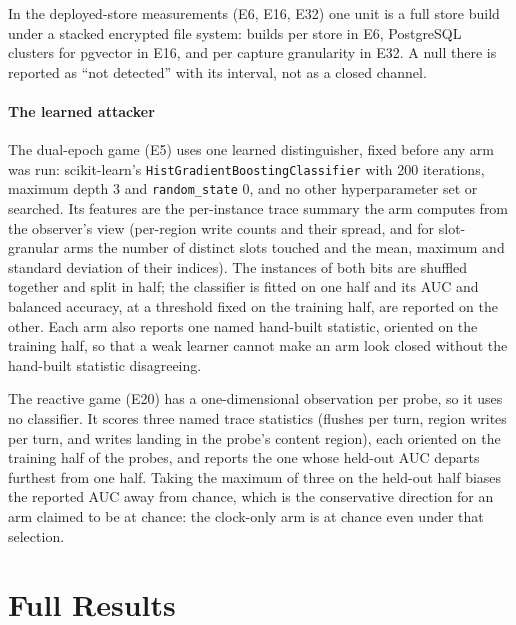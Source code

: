\documentclass[10pt,journal,compsoc]{IEEEtran}
\begin{document}
In the deployed-store measurements (E6, E16, E32) one unit is a full store build under a stacked
encrypted file system: \REsixSeeds{} builds per store in E6, \REsixteenPgSeeds{} PostgreSQL
clusters for pgvector in E16, and \REthirtytwoSeeds{} per capture granularity in E32. A null there
is reported as ``not detected'' with its interval, not as a closed channel.

\paragraph{The learned attacker} The dual-epoch game (E5) uses one learned distinguisher, fixed
before any arm was run: scikit-learn's
\texttt{HistGradientBoostingClassifier} with 200 iterations, maximum depth 3 and
\texttt{random\_state} 0, and no other hyperparameter set or searched. Its features are the
per-instance trace summary the arm computes from the observer's view (per-region write counts and
their spread, and for slot-granular arms the number of distinct slots touched and the mean, maximum
and standard deviation of their indices). The instances of both bits are shuffled together and
split in half; the classifier is fitted on one half and its AUC and balanced accuracy, at a
threshold fixed on the training half, are reported on the other. Each arm also reports one named
hand-built statistic, oriented on the training half, so that a weak learner cannot make an arm look
closed without the hand-built statistic disagreeing.

The reactive game (E20) has a one-dimensional observation per probe, so it uses no classifier. It
scores three named trace statistics (flushes per turn, region writes per turn, and writes landing
in the probe's content region), each
oriented on the training half of the probes, and reports the one whose held-out AUC departs
furthest from one half. Taking the maximum of three on the held-out half biases the reported AUC
away from chance, which is the conservative direction for an arm claimed to be at chance: the clock-only
arm is at chance even under that selection.

\section{Full Results}
\label{supp:full}
\end{document}
